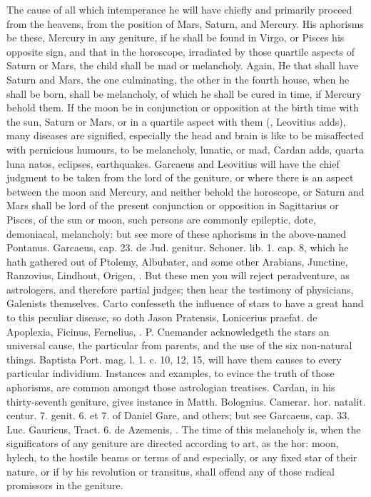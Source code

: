 {{The cause of all which intemperance he will have chiefly and primarily proceed
from the heavens, from the position of Mars, Saturn, and Mercury.
His aphorisms be these, Mercury in any geniture, if he shall be
found in Virgo, or Pisces his opposite sign, and that in the horoscope,
irradiated by those quartile aspects of Saturn or Mars, the child shall
be mad or melancholy. Again, He that shall have Saturn and Mars,
the one culminating, the other in the fourth house, when he shall be
born, shall be melancholy, of which he shall be cured in time, if
Mercury behold them. If the moon be in conjunction or opposition
at the birth time with the sun, Saturn or Mars, or in a quartile aspect
with them (, Leovitius adds), many diseases are
signified, especially the head and brain is like to be misaffected with
pernicious humours, to be melancholy, lunatic, or mad, Cardan adds,
quarta luna natos, eclipses, earthquakes. Garcaeus and Leovitius will
have the chief judgment to be taken from the lord of the geniture, or
where there is an aspect between the moon and Mercury, and neither
behold the horoscope, or Saturn and Mars shall be lord of the present
conjunction or opposition in Sagittarius or Pisces, of the sun or moon,
such persons are commonly epileptic, dote, demoniacal, melancholy: but
see more of these aphorisms in the above-named Pontanus. Garcaeus, cap.
23. de Jud. genitur. Schoner. lib. 1. cap. 8, which he hath gathered
out of Ptolemy, Albubater, and some other Arabians, Junctine,
Ranzovius, Lindhout, Origen, \etc{}. But these men you will reject
peradventure, as astrologers, and therefore partial judges; then hear
the testimony of physicians, Galenists themselves. Carto
confesseth the influence of stars to have a great hand to this peculiar
disease, so doth Jason Pratensis, Lonicerius praefat. de Apoplexia,
Ficinus, Fernelius, \etc{}. P. Cnemander acknowledgeth the stars an
universal cause, the particular from parents, and the use of the six
non-natural things. Baptista Port. mag. l. 1. c. 10, 12, 15, will have
them causes to every particular individium. Instances and examples, to
evince the truth of those aphorisms, are common amongst those
astrologian treatises. Cardan, in his thirty-seventh geniture, gives
instance in Matth. Bolognius. Camerar. hor. natalit. centur. 7. genit.
6. et 7. of Daniel Gare, and others; but see Garcaeus, cap. 33. Luc.
Gauricus, Tract. 6. de Azemenis, \etc{}. The time of this melancholy is,
when the significators of any geniture are directed according to art,
as the hor: moon, hylech, \etc{} to the hostile beams or terms of \saturn{} and \mars{}
especially, or any fixed star of their nature, or if \saturn{} by his
revolution or transitus, shall offend any of those radical promissors
in the geniture.

}}
